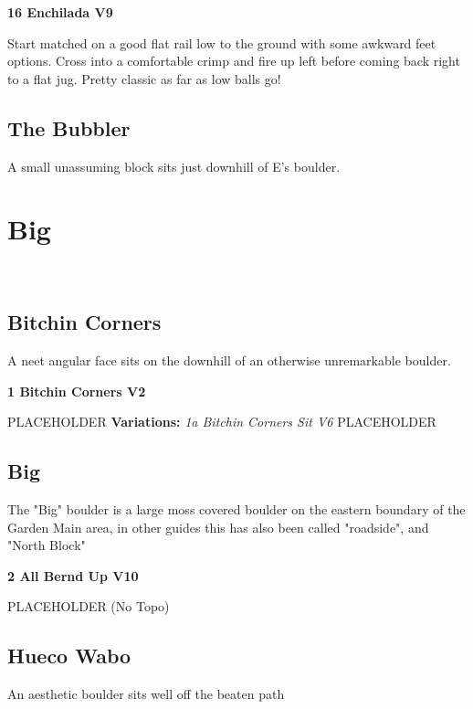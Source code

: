 \begin{multicols*}{2}
					\label{rt:Enchilada} \colorbox{Goldenrod!50}{\textbf{16 Enchilada V9 \ding{72}   }}
					\begin{adjustwidth}{1cm}{}
					Start matched on a good flat rail low to the ground with some awkward feet options. Cross into a comfortable crimp and fire up left before coming back right to a flat jug. Pretty classic as far as low balls go!
					\end{adjustwidth}
			\subsection*{The Bubbler}\label{bf:The Bubbler}
			A small unassuming block sits just downhill of E's boulder.
			
		\section{Big}\label{sa:Big}
	\
			\subsection*{Bitchin Corners}\label{bf:Bitchin Corners}
			A neet angular face sits on the downhill of an otherwise unremarkable boulder.
			

					\label{rt:Bitchin Corners} \colorbox{green!20}{\textbf{1 Bitchin Corners V2  }}
					\begin{adjustwidth}{1cm}{}
					PLACEHOLDER
					\newline \textbf{Variations:} \newline
						\label{vr:Bitchin Corners Sit} \colorbox{RoyalBlue!20}{\emph{1a Bitchin Corners Sit V6  }}
						PLACEHOLDER
					\end{adjustwidth}
			\subsection*{Big}\label{bf:Big}
			The "Big" boulder is a large moss covered boulder on the eastern boundary of the Garden Main area, in other guides this has also been called "roadside", and "North Block"
			
					\label{rt:All Bernd Up} \colorbox{red!20}{\textbf{2 All Bernd Up V10  }}
					\begin{adjustwidth}{1cm}{}
					PLACEHOLDER
						\newline (No Topo) 
					\end{adjustwidth}
			\subsection*{Hueco Wabo}\label{bf:Hueco Wabo}
			An aesthetic boulder sits well off the beaten path
			

\end{multicols*}

